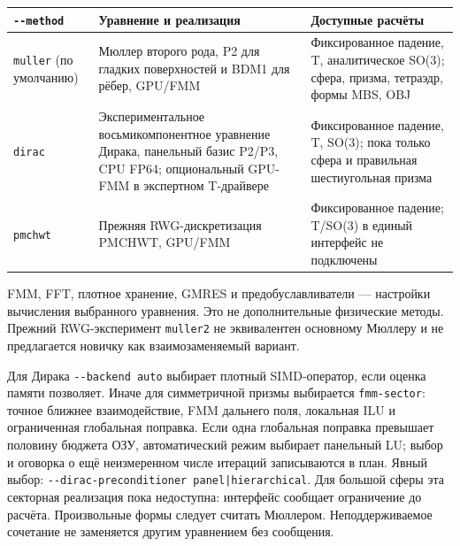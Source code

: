 \documentclass[
  russian,
  11pt,
  a4paper,
]{report}
\newcounter{none} %
\begin{document}
{\def\LTcaptype{none} %
\begin{longtable}[]{@{}
  >{\raggedright\arraybackslash}p{}
  >{\raggedright\arraybackslash}p{}
  >{\raggedright\arraybackslash}p{}@{}}
\toprule\noalign{}
\begin{minipage}[b]{\linewidth}\raggedright
\nolinkurl{--method}
\end{minipage} & \begin{minipage}[b]{\linewidth}\raggedright
Уравнение и реализация
\end{minipage} & \begin{minipage}[b]{\linewidth}\raggedright
Доступные расчёты
\end{minipage} \\
\midrule\noalign{}
\endhead
\bottomrule\noalign{}
\endlastfoot
\nolinkurl{muller} (по умолчанию) & Мюллер второго рода, P2 для гладких
поверхностей и BDM1 для рёбер, GPU/FMM & Фиксированное падение, T,
аналитическое SO(3); сфера, призма, тетраэдр, формы MBS, OBJ \\
\nolinkurl{dirac} & Экспериментальное восьмикомпонентное уравнение
Дирака, панельный базис P2/P3, CPU FP64; опциональный GPU-FMM в
экспертном T-драйвере & Фиксированное падение, T, SO(3); пока только
сфера и правильная шестиугольная призма \\
\nolinkurl{pmchwt} & Прежняя RWG-дискретизация PMCHWT, GPU/FMM &
Фиксированное падение; T/SO(3) в единый интерфейс не подключены \\
\end{longtable}
}

FMM, FFT, плотное хранение, GMRES и предобуславливатели --- настройки
вычисления выбранного уравнения. Это не дополнительные физические
методы. Прежний RWG-эксперимент \nolinkurl{muller2} не эквивалентен
основному Мюллеру и не предлагается новичку как взаимозаменяемый
вариант.

Для Дирака \nolinkurl{--backend auto} выбирает плотный SIMD-оператор,
если оценка памяти позволяет. Иначе для симметричной призмы выбирается
\nolinkurl{fmm-sector}: точное ближнее взаимодействие, FMM дальнего
поля, локальная ILU и ограниченная глобальная поправка. Если одна
глобальная поправка превышает половину бюджета ОЗУ, автоматический режим
выбирает панельный LU; выбор и оговорка о ещё неизмеренном числе
итераций записываются в план. Явный выбор:
\nolinkurl{--dirac-preconditioner panel|hierarchical}. Для большой сферы
эта секторная реализация пока недоступна: интерфейс сообщает ограничение
до расчёта. Произвольные формы следует считать Мюллером.
Неподдерживаемое сочетание не заменяется другим уравнением без
сообщения.
\end{document}
